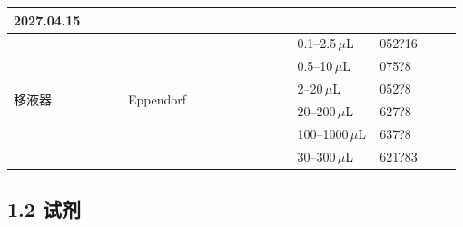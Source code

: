 \documentclass[UTF8,10pt,a4paper,fontset=fandol]{ctexart}
\newcommand{\fieldvalue}[1]{#1}
\newcommand{\handwritten}[1]{#1}
\begin{document}
\begin{center}
\begin{tabular}{|p{0.25\linewidth}|p{0.18\linewidth}|p{0.19\linewidth}|p{0.18\linewidth}|p{0.18\linewidth}|}
\fieldvalue{\handwritten{2027.04.15}}\\
\hline
\multirow{6}{*}{移液器} & \multirow{6}{*}{Eppendorf} & \multirow{6}{*}{} &
\fieldvalue{\handwritten{0.1--2.5\,\(\mu\)L}} &
\fieldvalue{\handwritten{052?16}}\\
\cline{4-5}
& & &
\fieldvalue{\handwritten{0.5--10\,\(\mu\)L}} &
\fieldvalue{\handwritten{075?8}}\\
\cline{4-5}
& & &
\fieldvalue{\handwritten{2--20\,\(\mu\)L}} &
\fieldvalue{\handwritten{052?8}}\\
\cline{4-5}
& & &
\fieldvalue{\handwritten{20--200\,\(\mu\)L}} &
\fieldvalue{\handwritten{627?8}}\\
\cline{4-5}
& & &
\fieldvalue{\handwritten{100--1000\,\(\mu\)L}} &
\fieldvalue{\handwritten{637?8}}\\
\cline{4-5}
& & &
\fieldvalue{\handwritten{30--300\,\(\mu\)L}} &
\fieldvalue{\handwritten{621?83}}\\
\hline
\end{tabular}
\end{center}

\subsection{1.2 试剂}
\end{document}
